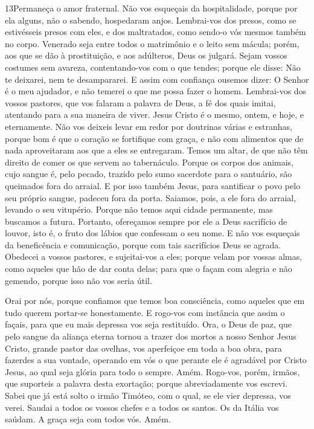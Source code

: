\medskip

\lettrine{13} Permaneça o amor fraternal. Não vos
esqueçais da hospitalidade, porque por ela alguns, não o sabendo,
hospedaram anjos. Lembrai-vos dos presos, como se estivésseis
presos com eles, e dos maltratados, como sendo-o vós mesmos também
no corpo. Venerado seja entre todos o matrimônio e o leito sem
mácula; porém, aos que se dão à prostituição, e aos adúlteros, Deus
os julgará. Sejam vossos costumes sem avareza, contentando-vos
com o que tendes; porque ele disse: Não te deixarei, nem te
desampararei. E assim com confiança ousemos dizer: O Senhor é o
meu ajudador, e não temerei o que me possa fazer o homem.
Lembrai-vos dos vossos pastores, que vos falaram a palavra de
Deus, a fé dos quais imitai, atentando para a sua maneira de viver.
Jesus Cristo é o mesmo, ontem, e hoje, e eternamente. Não
vos deixeis levar em redor por doutrinas várias e estranhas, porque
bom é que o coração se fortifique com graça, e não com alimentos que
de nada aproveitaram aos que a eles se entregaram. Temos um
altar, de que não têm direito de comer os que servem ao tabernáculo.
Porque os corpos dos animais, cujo sangue é, pelo pecado,
trazido pelo sumo sacerdote para o santuário, são queimados fora do
arraial. E por isso também Jesus, para santificar o povo pelo
seu próprio sangue, padeceu fora da porta. Saiamos, pois, a
ele fora do arraial, levando o seu vitupério. Porque não
temos aqui cidade permanente, mas buscamos a futura.
Portanto, ofereçamos sempre por ele a Deus sacrifício de
louvor, isto é, o fruto dos lábios que confessam o seu nome.
E não vos esqueçais da beneficência e comunicação, porque com
tais sacrifícios Deus se agrada. Obedecei a vossos pastores,
e sujeitai-vos a eles; porque velam por vossas almas, como aqueles
que hão de dar conta delas; para que o façam com alegria e não
gemendo, porque isso não vos seria útil.

Orai por nós, porque confiamos que temos boa consciência, como
aqueles que em tudo querem portar-se honestamente. E rogo-vos
com instância que assim o façais, para que eu mais depressa vos seja
restituído. Ora, o Deus de paz, que pelo sangue da aliança
eterna tornou a trazer dos mortos a nosso Senhor Jesus Cristo,
grande pastor das ovelhas, vos aperfeiçoe em toda a boa obra,
para fazerdes a sua vontade, operando em vós o que perante ele é
agradável por Cristo Jesus, ao qual seja glória para todo o sempre.
Amém. Rogo-vos, porém, irmãos, que suporteis a palavra desta
exortação; porque abreviadamente vos escrevi. Sabei que já
está solto o irmão Timóteo, com o qual, se ele vier depressa, vos
verei. Saudai a todos os vossos chefes e a todos os santos.
Os da Itália vos saúdam. A graça seja com todos vós. Amém.

